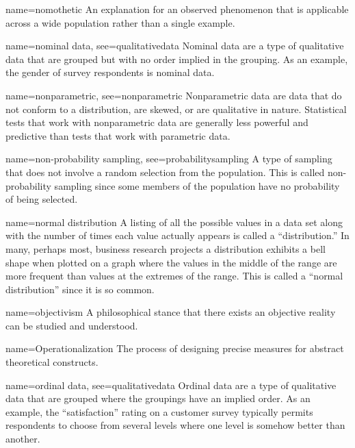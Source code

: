 

{name={nomothetic}}
{%
	An explanation for an observed phenomenon that is applicable across a wide population rather than a single example.
}

{name={nominal data},
	see={qualitativedata}}
{%
	Nominal data are a type of qualitative data that are grouped but with no order implied in the grouping. As an example, the gender of survey respondents is nominal data.
}

{name={nonparametric},
	see={nonparametric}}
{%
	Nonparametric data are data that do not conform to a distribution, are skewed, or are qualitative in nature. Statistical tests that work with nonparametric data are generally less powerful and predictive than tests that work with parametric data.
}

{name={non-probability sampling},
	see={probabilitysampling}}
{%
	A type of sampling that does not involve a random selection from the population. This is called non-probability sampling since some members of the population have no probability of being selected.
}

{name={normal distribution}}
{%
	A listing of all the possible values in a data set along with the number of times each value actually appears is called a ``distribution.'' In many, perhaps most, business research projects a distribution exhibits a bell shape when plotted on a graph where the values in the middle of the range are more frequent than values at the extremes of the range. This is called a ``normal distribution'' since it is so common.
}

{name={objectivism}}
{%
	A philosophical stance that there exists an objective reality can be studied and understood.
}


{name={Operationalization}}
{%
	 The process of designing precise measures for abstract theoretical constructs. 
}

{name={ordinal data},
	see={qualitativedata}}
{%
	Ordinal data are a type of qualitative data that are grouped where the groupings have an implied order. As an example, the ``satisfaction'' rating on a customer survey typically permits respondents to choose from several levels where one level is somehow better than another.
}

